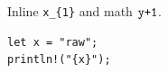 Inline \verb|x_{1}| and math $\verb|y+1|$.

\begin{lstlisting}let x = "raw";
println!("{x}");\end{lstlisting}